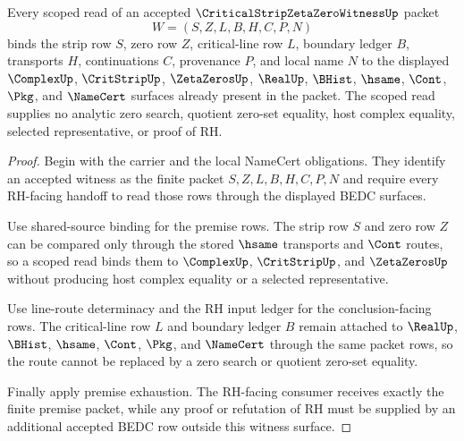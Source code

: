 \begin{theorem}
\label{thm:critical-strip-zeta-zero-witness-scope-binding}
Every scoped read of an accepted $\CriticalStripZetaZeroWitnessUp$ packet
$$
W=(S,Z,L,B,H,C,P,N)
$$
binds the strip row $S$, zero row $Z$, critical-line row $L$, boundary ledger $B$, transports $H$, continuations $C$, provenance $P$, and local name $N$ to the displayed $\ComplexUp$, $\CritStripUp$, $\ZetaZerosUp$, $\RealUp$, $\BHist$, $\hsame$, $\Cont$, $\Pkg$, and $\NameCert$ surfaces already present in the packet. The scoped read supplies no analytic zero search, quotient zero-set equality, host complex equality, selected representative, or proof of RH.
\end{theorem}
\begin{proof}
Begin with the carrier and the local NameCert obligations. They identify an accepted witness as the finite packet $S,Z,L,B,H,C,P,N$ and require every RH-facing handoff to read those rows through the displayed BEDC surfaces.

Use shared-source binding for the premise rows. The strip row $S$ and zero row $Z$ can be compared only through the stored $\hsame$ transports and $\Cont$ routes, so a scoped read binds them to $\ComplexUp$, $\CritStripUp$, and $\ZetaZerosUp$ without producing host complex equality or a selected representative.

Use line-route determinacy and the RH input ledger for the conclusion-facing rows. The critical-line row $L$ and boundary ledger $B$ remain attached to $\RealUp$, $\BHist$, $\hsame$, $\Cont$, $\Pkg$, and $\NameCert$ through the same packet rows, so the route cannot be replaced by a zero search or quotient zero-set equality.

Finally apply premise exhaustion. The RH-facing consumer receives exactly the finite premise packet, while any proof or refutation of RH must be supplied by an additional accepted BEDC row outside this witness surface.
\end{proof}

